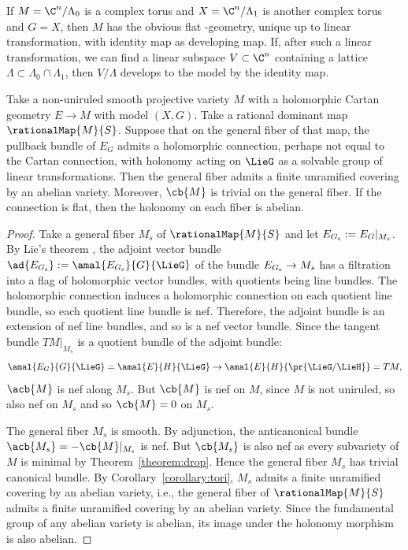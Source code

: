 \begin{Example}
If $M = \C^{n}/\Lambda_0$ is a complex torus and $X = \C^{n}/\Lambda_1$ is another complex torus and $G = X$, then $M$ has the obvious flat -geometry, unique up to linear transformation, with identity map as developing map.
If, after such a linear transformation, we can find a linear subspace $V \subset \C^{n}$ containing a
lattice $\Lambda \subset \Lambda_0 \cap \Lambda_1$, then $V/\Lambda$ develops to the model by the identity map.
\end{Example}

\begin{Lemma}\label{lemma:abelian.pancake}
Take a non-uniruled smooth projective variety $M$ with a holomorphic Cartan geometry $E \to M$ with model $(X, G)$.
Take a rational dominant map $\rationalMap{M}{S}$.
Suppose that on the general fiber of that map, the pullback bundle of $E_G$ admits a holomorphic connection, perhaps not equal to the Cartan connection, with holonomy acting on $\LieG$ as a solvable group of linear transformations.
Then the general fiber admits a finite unramified covering by an abelian variety.
Moreover, $\cb{M}$ is trivial on the general fiber.
If the connection is flat, then the holonomy on each fiber is abelian.
\end{Lemma}

\begin{proof}
Take a general fiber $M_{s} $ of $\rationalMap{M}{S}$ and let $E_{G_{\rm s} } := E_G|_{M_{s} }$.
By Lie's theorem \cite[Theorem 3]{Serre:2001}, the adjoint vector bundle $\ad{E_{G_{\rm s} }} := \amal{E_{G_{\rm s}}}{G}{\LieG}$ of the bundle $E_{G_{\rm s} }
\to M_{s} $ has a filtration into a flag of holomorphic vector bundles, with quotients being line bundles.
The holomorphic connection induces a holomorphic connection on each quotient line bundle, so each quotient line bundle is nef.
Therefore, the adjoint bundle is an extension of nef line bundles, and so is a nef vector bundle.
Since the tangent bundle $TM|_{M_{s} }$ is a quotient bundle of the adjoint bundle:
\[
\amal{E_G}{G}{\LieG} = \amal{E}{H}{\LieG} \to \amal{E}{H}{\pr{\LieG/\LieH}} = TM,
\]
$\acb{M}$ is nef along $M_{s} $.
But $\cb{M}$ is nef on $M$, since $M$ is not uniruled, so also nef on $M_{s} $ and so $\cb{M} = 0$ on $M_{s} $.

The general fiber $M_{s} $ is smooth.
By adjunction, the anticanonical bundle $\acb{M_{s}} = - \cb{M} |_{M_{s}}$ is nef.
But $\cb{M_{s}}$ is also nef as every subvariety of $M$ is minimal by Theorem~\ref{theorem:drop}.
Hence the general fiber $M_{s}$ has trivial canonical bundle.
By Corollary~\ref{corollary:tori}, $M_{s}$ admits a finite unramified covering by an abelian variety, i.e., the general fiber of $\rationalMap{M}{S}$ admits a finite unramified covering by an abelian variety.
Since the fundamental group of any abelian variety is abelian, its image under the holonomy morphism is also abelian.
\end{proof}

